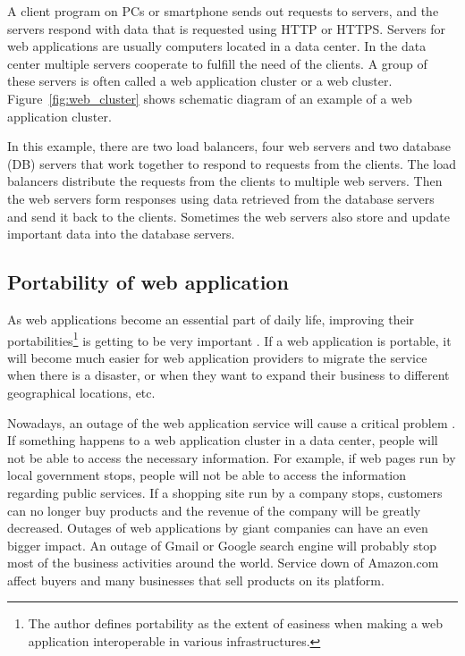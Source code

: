 A client program on PCs or smartphone sends out requests to servers, and the servers respond with data that is requested using HTTP or HTTPS. 
Servers for web applications are usually computers located in a data center.
In the data center multiple servers cooperate to fulfill the need of the clients.
A group of these servers is often called a web application cluster or a web cluster.
Figure~\ref{fig:web_cluster} shows schematic diagram of an example of a web application cluster.

In this example, there are two load balancers, four web servers and two database (DB) servers that work together to respond to  requests from the clients.
The load balancers distribute the requests from the clients to multiple web servers.
Then the web servers form responses using data retrieved from the database servers and send it back to the clients.
Sometimes the web servers also store and update important data into the database servers.

\subsection{Portability of web application}


  As web applications become an essential part of daily life, improving their portabilities\footnote{
    The author defines portability as the extent of easiness when making a web application interoperable in various infrastructures.
  }
 is getting to be very important \cite{opara2016critical,petcu2014portability}.
If a web application is portable, it will become much easier for web application providers to migrate the service when there is a disaster, or when they want to expand their business to different geographical locations, etc. 


 Nowadays, an outage of the web application service will cause a critical problem \cite{}.
If something happens to a web application cluster in a data center, people will not be able to access the necessary information.
%
For example, if web pages run by local government stops, people will not be able to access the information regarding public services.
If a shopping site run by a company stops, customers can no longer buy products and the revenue of the company will be greatly decreased.
Outages of web applications by giant companies can have an even bigger impact.
An outage of Gmail or Google search engine will probably stop most of the business activities around the world.
Service down of Amazon.com affect buyers and many businesses that sell products on its platform.

